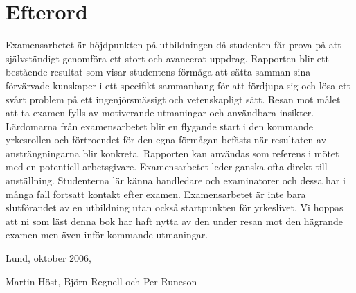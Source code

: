 \section{Efterord}\label{efterord}

Examensarbetet är höjdpunkten på utbildningen då studenten får prova på
att självständigt genomföra ett stort och avancerat uppdrag. Rapporten
blir ett bestående resultat som visar studentens förmåga att sätta
samman sina förvärvade kunskaper i ett specifikt sammanhang för att
fördjupa sig och lösa ett svårt problem på ett ingenjörsmässigt och
vetenskapligt sätt. Resan mot målet att ta examen fylls av motiverande
utmaningar och användbara insikter. Lärdomarna från examensarbetet blir
en flygande start i den kommande yrkesrollen och förtroendet för den
egna förmågan befästs när resultaten av ansträngningarna blir konkreta.
Rapporten kan användas som referens i mötet med en potentiell
arbetsgivare. Examensarbetet leder ganska ofta direkt till anställning.
Studenterna lär känna handledare och examinatorer och dessa har i många
fall fortsatt kontakt efter examen. Examensarbetet är inte bara
slutförandet av en utbildning utan också startpunkten för yrkeslivet. Vi
hoppas att ni som läst denna bok har haft nytta av den under resan mot
den hägrande examen men även inför kommande utmaningar.

Lund, oktober 2006,

Martin Höst, Björn Regnell och Per Runeson
